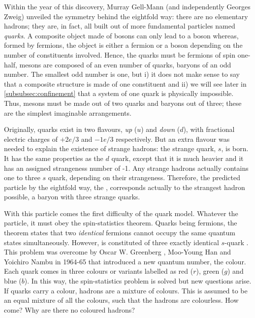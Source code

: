 Within the year of this discovery, Murray Gell-Mann (and independently Georges Zweig) unveiled the symmetry behind the eightfold way: there are no elementary hadrons; they are, in fact, all built out of more fundamental particles named \textit{quarks}. A composite object made of bosons can only lead to a boson whereas, formed by fermions, the object is either a fermion or a boson depending on the number of constituents involved. Hence, the quarks must be fermions of spin one-half, mesons are composed of an even number of quarks, baryons of an odd number. The smallest odd number is one, but i) it does not make sense to say that a composite structure is made of one constituent and ii) we will see later in \Sec\ref{subsubsec:confinement} that a system of one quark is physically impossible. Thus, mesons must be made out of two quarks and baryons out of three; these are the simplest imaginable arrangements. 

Originally, quarks exist in two flavours, \textit{up} ($u$) and \textit{down} ($d$), with fractional electric charges of $+2e/3$ and $-1e/3$ respectively. But an extra flavour was needed to explain the existence of strange hadrons: the strange quark, $s$, is born. It has the same properties as the $d$ quark, except that it is much heavier and it has an assigned strangeness number of -1. Any strange hadrons actually contains one to three $s$ quark, depending on their strangeness. Therefore, the predicted particle by the eightfold way, the \rmOmegaM, corresponds actually to the strangest hadron possible, a baryon with three strange quarks.

With this particle comes the first difficulty of the quark model. Whatever the particle, it must obey the spin-statistics theorem. Quarks being fermions, the theorem states that two \textit{identical} fermions cannot occupy the same quantum states simultaneously. However, \rmOmegaM is constituted of three exactly identical $s$-quark \cite{skandsIntroductionQCD2013}. This problem was overcome by Oscar W. Greenberg \cite{greenbergSpinUnitarySpinIndependence1964}, Moo-Young Han and Yoichiro Nambu \cite{hanThreeTripletModelDouble1965} in 1964-65 that introduced a new quantum number, the colour. Each quark comes in three colours or variants labelled as red ($r$), green ($g$) and blue ($b$). In this way, the spin-statistics problem is solved but new questions arise. If quarks carry a colour, hadrons are a mixture of colours. This is assumed to be an equal mixture of all the colours, such that the hadrons are colourless. How come? Why are there no coloured hadrons?

